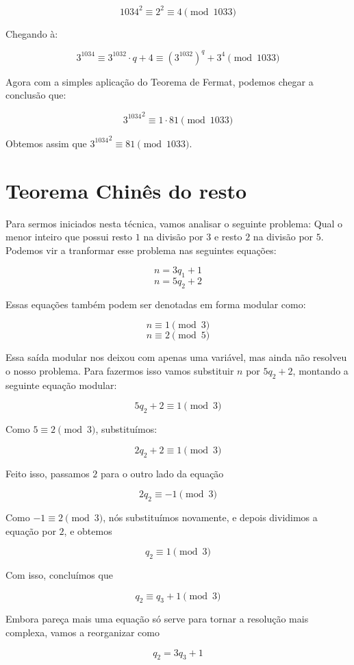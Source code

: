 $$1034^2 \equiv 2^2 \equiv 4 \pmod{1033}$$

Chegando \`a:

$$3^{1034} \equiv 3^{1032}\cdot q + 4 \equiv (3^{1032})^{q} + 3^4 \pmod{1033}$$

Agora com a simples aplica\c{c}\~ao do Teorema de Fermat, podemos chegar a conclus\~ao que: 

$${3^{1034}}^2 \equiv 1 \cdot 81 \pmod{1033}$$

Obtemos assim que ${3^{1034}}^{2} \equiv 81 \pmod{1033}$.

\section{Teorema Chin\^es do resto}

Para sermos iniciados nesta t\'ecnica, vamos analisar o seguinte problema: Qual o menor inteiro que possui resto $1$ na divis\~ao por $3$ e resto $2$ na divis\~ao por $5$. Podemos vir a tranformar esse problema nas seguintes equa\c{c}\~oes:

$$n = 3q_1 + 1$$ $$n = 5q_2 + 2$$

Essas equa\c{c}\~oes tamb\'em podem ser denotadas em forma modular como:

$$n \equiv 1\pmod{3}$$ $$n \equiv 2 \pmod{5}$$

Essa sa\'ida modular nos deixou com apenas uma vari\'avel, mas ainda n\~ao resolveu o nosso problema. Para fazermos isso vamos substituir $n$ por $5q_2 + 2$, montando a seguinte equa\c{c}\~ao modular:

$$5q_2 + 2 \equiv 1 \pmod{3}$$

Como $5 \equiv 2\pmod{3}$, substitu\'imos:

$$ 2q_2 + 2 \equiv 1 \pmod{3}$$

Feito isso, passamos $2$ para o outro lado da equa\c{c}\~ao

$$ 2q_2  \equiv -1 \pmod{3}$$

Como $-1 \equiv 2 \pmod{3}$, n\'os substitu\'imos novamente, e depois dividimos a equa\c{c}\~ao por $2$, e obtemos

$$ q_2  \equiv 1 \pmod{3}$$

Com isso, conclu\'imos que

$$ q_2  \equiv q_3 + 1 \pmod{3}$$

Embora pare\c{c}a mais uma equa\c{c}\~ao s\'o serve para tornar a resolu\c{c}\~ao mais complexa, vamos a reorganizar como

$$ q_2 = 3q_3 + 1 $$

